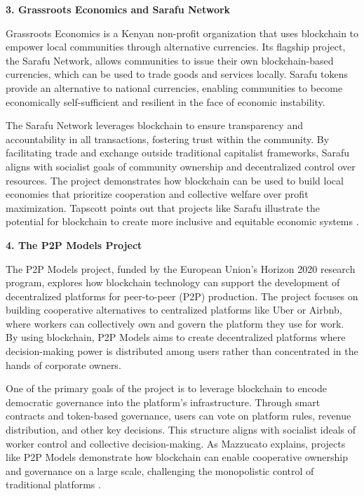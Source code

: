 \begin{refsection}
\textbf{3. Grassroots Economics and Sarafu Network}

Grassroots Economics is a Kenyan non-profit organization that uses blockchain to empower local communities through alternative currencies. Its flagship project, the Sarafu Network, allows communities to issue their own blockchain-based currencies, which can be used to trade goods and services locally. Sarafu tokens provide an alternative to national currencies, enabling communities to become economically self-sufficient and resilient in the face of economic instability.

The Sarafu Network leverages blockchain to ensure transparency and accountability in all transactions, fostering trust within the community. By facilitating trade and exchange outside traditional capitalist frameworks, Sarafu aligns with socialist goals of community ownership and decentralized control over resources. The project demonstrates how blockchain can be used to build local economies that prioritize cooperation and collective welfare over profit maximization. Tapscott points out that projects like Sarafu illustrate the potential for blockchain to create more inclusive and equitable economic systems \cite[pp.~189-192]{tapscott2016}.

\textbf{4. The P2P Models Project}

The P2P Models project, funded by the European Union’s Horizon 2020 research program, explores how blockchain technology can support the development of decentralized platforms for peer-to-peer (P2P) production. The project focuses on building cooperative alternatives to centralized platforms like Uber or Airbnb, where workers can collectively own and govern the platform they use for work. By using blockchain, P2P Models aims to create decentralized platforms where decision-making power is distributed among users rather than concentrated in the hands of corporate owners.

One of the primary goals of the project is to leverage blockchain to encode democratic governance into the platform’s infrastructure. Through smart contracts and token-based governance, users can vote on platform rules, revenue distribution, and other key decisions. This structure aligns with socialist ideals of worker control and collective decision-making. As Mazzucato explains, projects like P2P Models demonstrate how blockchain can enable cooperative ownership and governance on a large scale, challenging the monopolistic control of traditional platforms \cite[pp.~67-68]{mazzucato2023}.


\end{refsection}
